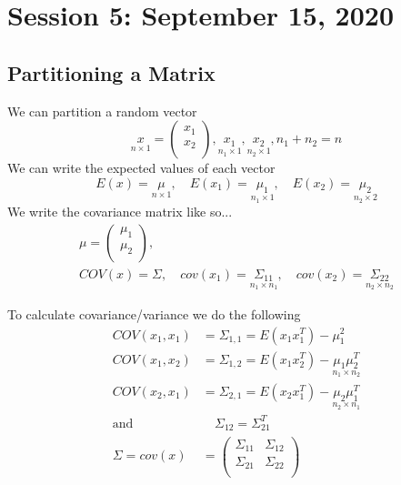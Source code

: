\chapter{Session 5: September 15, 2020}
\label{Fifth}
\section{Partitioning a Matrix}
We can partition a random vector 
\begin{equation*}
\underset{n \times 1}{x} =
    \begin{pmatrix}
    x_1\\
    x_2\\
    \end{pmatrix}, 
    \underset{n_1 \times 1}{x_1},
    \underset{n_2 \times 1}{x_2},
    n_1 + n_2 = n
\end{equation*}
We can write the expected values of each vector
\begin{equation*}
    E(x) = \underset{n \times 1}{\mu},\quad
    E(x_1) = \underset{n_1 \times 1}{\mu_1}, \quad
    E(x_2) = \underset{n_2 \times 2}{\mu_2}
\end{equation*}
We write the covariance matrix like so...
\begin{align*}
    \mu =
    \begin{pmatrix}
    \mu_1\\
    \mu_2\\
    \end{pmatrix}, \\
    COV(x) = \Sigma, \quad
    cov(x_1) =\underset{n_1 \times n_1}{\Sigma_{11}},
    \quad cov(x_2) =\underset{n_2 \times n_2}{\Sigma_{22}}
\end{align*}

To calculate covariance/variance we do the following
\begin{align*}
    COV(x_1,x_1) &= \Sigma_{1,1} = E(x_1x_1^T)-\mu_1^2 \\
    COV(x_1,x_2) &= \Sigma_{1,2} = E(x_1x_2^T)-\underset{n_1 \times n_2}{\mu_1\mu_2^T} \\       
    COV(x_2,x_1) &= \Sigma_{2,1} = E(x_2x_1^T)-\underset{n_2 \times n_1}{\mu_2\mu_1^T}\\
    \text{and} &\quad \Sigma_{12} = \Sigma_{21}^T \\
    \Sigma = cov(x) &= 
    \begin{pmatrix}
    \Sigma_{11} & \Sigma_{12} \\
    \Sigma_{21} & \Sigma_{22} \\
    \end{pmatrix}\\
\end{align*}

